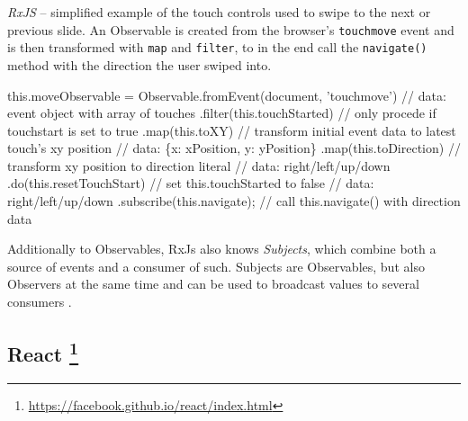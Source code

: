 \begin{program}
\caption{\emph{RxJS} -- simplified example of the touch controls used to swipe to the next or previous slide. An Observable is created from the browser's \texttt{touchmove} event and is then transformed with \texttt{map} and \texttt{filter}, to in the end call the \texttt{navigate()} method with the direction the user swiped into.}
\label{prog:implementation-technologies-rxjs}
\begin{JsCode}
this.moveObservable = Observable.fromEvent(document, 'touchmove')
  // data: event object with array of touches
  .filter(this.touchStarted) // only procede if touchstart is set to true
  .map(this.toXY) // transform initial event data to latest touch's xy position
  // data: \{x: xPosition, y: yPosition\}
  .map(this.toDirection) // transform xy position to direction literal
  // data: right/left/up/down
  .do(this.resetTouchStart) // set this.touchStarted to false
  // data: right/left/up/down
  .subscribe(this.navigate); // call this.navigate() with direction data
\end{JsCode}
\end{program}

Additionally to Observables, RxJs also knows \emph{Subjects}, which combine both a source of events and a consumer of such. Subjects are Observables, but also Observers at the same time and can be used to broadcast values to several consumers \cite{rxjs-docu}.

\subsection[React]%
             {React%
             \protect\footnote{\url{https://facebook.github.io/react/index.html}}}%
\label{sec:implementation-technologies-react}

